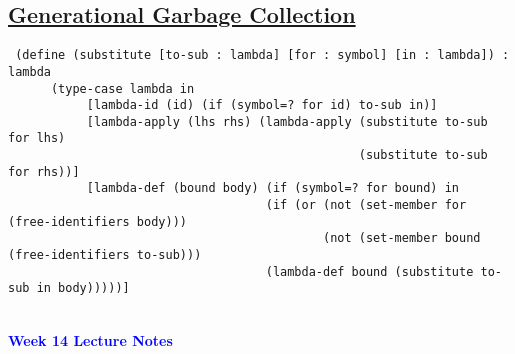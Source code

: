 \documentclass{article}
\begin{document}
\begin{flushleft}
\begin{flushleft}
\begin{flushleft}
\begin{flushleft}
\begin{flushleft}
\subsection*{\underline{Generational Garbage Collection}}
\vspace*{0.4cm}
\begin{verbatim}
 (define (substitute [to-sub : lambda] [for : symbol] [in : lambda]) : lambda
      (type-case lambda in
           [lambda-id (id) (if (symbol=? for id) to-sub in)]
           [lambda-apply (lhs rhs) (lambda-apply (substitute to-sub for lhs)
                                                 (substitute to-sub for rhs))]
           [lambda-def (bound body) (if (symbol=? for bound) in
                                    (if (or (not (set-member for (free-identifiers body)))
                                            (not (set-member bound (free-identifiers to-sub)))
                                    (lambda-def bound (substitute to-sub in body)))))]
\end{verbatim}
\noindent\makebox[\linewidth]{\rule{\paperwidth}{0.4pt}}\\
\vspace*{1.5cm}
\textcolor{blue}{\textbf{{\huge Week 14 Lecture Notes}}}


\end{flushleft}
\end{flushleft}
\end{flushleft}
\end{flushleft}
\end{flushleft}
\end{document}
